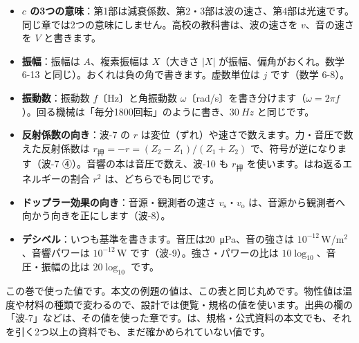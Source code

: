 {\small
\begin{itemize}[leftmargin=1.2\zw, itemsep=2pt, topsep=1pt, label={\color{bkVol}●}]
\item \textbf{$c$ の3つの意味}：第1部は減衰係数、第2・3部は波の速さ、第4部は光速です。同じ章では2つの意味にしません。高校の教科書は、波の速さを $v$、音の速さを $V$ と書きます。
\item \textbf{振幅}：振幅は $A$、複素振幅は $X$（大きさ $\lvert X\rvert$ が振幅、偏角がおくれ。数学 6-13 と同じ）。おくれは負の角で書きます。虚数単位は $j$ です（数学 6-8）。
\item \textbf{振動数}：振動数 $f$〔Hz〕と角振動数 $\omega$〔rad/s〕を書き分けます（$\omega=2\pi f$）。回る機械は「毎分1800回転」のように書き、$\qty{30}{Hz}$ と同じです。
\item \textbf{反射係数の向き}：波-7 の $r$ は変位（ずれ）や速さで数えます。力・音圧で数えた反射係数は $r_{\text{押}}=-r=(Z_2-Z_1)/(Z_1+Z_2)$ で、符号が逆になります（波-7 ④）。音響の本は音圧で数え、波-10 も $r_{\text{押}}$ を使います。はね返るエネルギーの割合 $r^2$ は、どちらでも同じです。
\item \textbf{ドップラー効果の向き}：音源・観測者の速さ $v_{\mathrm s}$・$v_{\mathrm o}$ は、音源から観測者へ向かう向きを正にします（波-8）。
\item \textbf{デシベル}：いつも基準を書きます。音圧は\qty{20}{\micro Pa}、音の強さは $10^{-12}$\,W/m$^2$、音響パワーは $10^{-12}$\,W です（波-9）。強さ・パワーの比は $10\log_{10}$、音圧・振幅の比は $20\log_{10}$ です。
\end{itemize}\par}

{\small この巻で使った値です。本文の例題の値は、この表と同じ丸めです。物性値は温度や材料の種類で変わるので、設計では便覧・規格の値を使います。出典の欄の「波-7」などは、その値を使った章です。\phyk は、規格・公式資料の本文でも、それを引く2つ以上の資料でも、まだ確かめられていない値です。\par}

